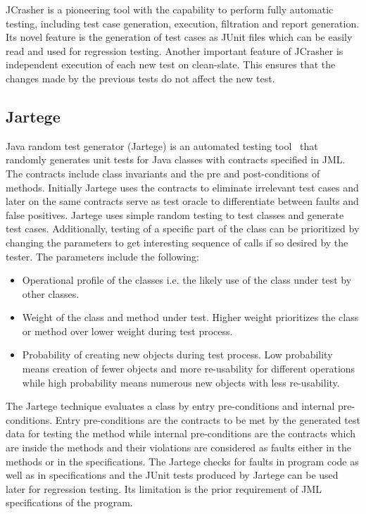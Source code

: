 JCrasher is a pioneering tool with the capability to perform fully automatic testing, including test case generation, execution, filtration and report generation. Its novel feature is the generation of test cases as JUnit files which can be easily read and used for regression testing. Another important feature of JCrasher is independent execution of each new test on clean-slate. This ensures that the changes made by the previous tests do not affect the new test.  



\subsection{Jartege} \label{jartege_2}
Java random test generator (Jartege) is an automated testing tool~\cite{oriat2005jartege} that randomly generates unit tests for Java classes with contracts specified in JML. The contracts include class invariants and the pre and post-conditions of methods. Initially Jartege uses the contracts to eliminate irrelevant test cases and later on the same contracts serve as test oracle to differentiate between faults and false positives. Jartege uses simple random testing to test classes and generate test cases. Additionally, testing of a specific part of the class can be prioritized by changing the parameters to get interesting sequence of calls if so desired by the tester. The parameters include the following: 

\begin{itemize}
\item Operational profile of the classes i.e. the likely use of the class under test by other classes.  
\item Weight of the class and method under test. Higher weight prioritizes the class or method over lower weight during test process. 
\item Probability of creating new objects during test process. Low probability means creation of fewer objects and more re-usability for different operations while high probability means numerous new objects with less re-usability.
\end{itemize}

The Jartege technique evaluates a class by entry pre-conditions and internal pre-conditions. Entry pre-conditions are the contracts to be met by the generated test data for testing the method while internal pre-conditions are the contracts which are inside the methods and their violations are considered as faults either in the methods or in the specifications. The Jartege checks for faults in program code as well as in specifications and the JUnit tests produced by Jartege can be used later for regression testing. Its limitation is the prior requirement of JML specifications of the program.


